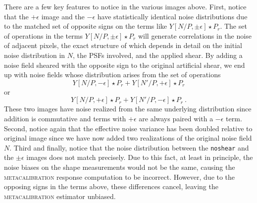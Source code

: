 \documentclass[twocolumn]{openjournal}
\makeatletter
\newcommand{\mcal}{\textsc{metacalibration}\@\xspace}
\newcommand{\noshear}{\texttt{noshear}\@\xspace}
\makeatother
\begin{document}
There are a few key features to notice in the various images above. First, notice that
the $+\epsilon$ image and the $-\epsilon$ have statistically identical noise
distributions due to the matched set of opposite signs on the terms like
$Y[N/P,\pm\epsilon] \star P_r$. The set of operations in the terms
$Y[N/P,\pm\epsilon] \star P_r$  will generate correlations in the noise of adjacent
pixels, the exact structure of which depends in  detail on the initial noise
distribution in $N$, the PSFs involved, and the applied shear. By adding a noise field
sheared with the opposite sign to the original artificial shear, we end up with noise
fields whose distribution arises from the set of operations
\begin{equation*}
Y[N/P, -\epsilon] \star P_r + Y[N'/P, +\epsilon] \star P_r
\end{equation*}
or
\begin{equation*}
Y[N/P, +\epsilon] \star P_r + Y[N'/P, -\epsilon] \star P_r\ .
\end{equation*}
These two images have noise realized from the same underlying distribution since
addition is commutative and terms with $+\epsilon$ are always paired with a $-\epsilon$
term. Second, notice again that the effective noise variance has been doubled relative
to original image since we have now added two realizations of the original noise field
$N$. Third and finally, notice that the noise distribution between the \noshear and the
$\pm\epsilon$ images does not match precisely. Due to this fact, at least in principle,
the noise biases on the shape measurements would not be the same, causing the \mcal
response computation to be incorrect. However, due to the opposing signs in the terms
above, these differences cancel, leaving the \mcal estimator unbiased.
\end{document}
